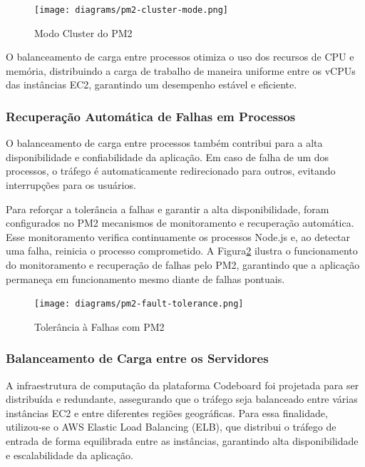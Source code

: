 \begin{figure}[H]
    \centering
    \texttt{[image: diagrams/pm2-cluster-mode.png]}
    \caption{Modo Cluster do PM2}
    \label{fig:pm2-cluster-mode}
\end{figure}

O balanceamento de carga entre processos otimiza o uso dos recursos de CPU e memória, distribuindo a carga de trabalho de maneira uniforme entre os vCPUs das instâncias EC2, garantindo um desempenho estável e eficiente.

\subsubsection{Recuperação Automática de Falhas em Processos}

O balanceamento de carga entre processos também contribui para a alta disponibilidade e confiabilidade da aplicação. Em caso de falha de um dos processos, o tráfego é automaticamente redirecionado para outros, evitando interrupções para os usuários.

Para reforçar a tolerância a falhas e garantir a alta disponibilidade, foram configurados no PM2 mecanismos de monitoramento e recuperação automática. Esse monitoramento verifica continuamente os processos Node.js e, ao detectar uma falha, reinicia o processo comprometido. A Figura\ref{fig:pm2-fault-tolerance} ilustra o funcionamento do monitoramento e recuperação de falhas pelo PM2, garantindo que a aplicação permaneça em funcionamento mesmo diante de falhas pontuais.


\begin{figure}[H]
    \centering
    \texttt{[image: diagrams/pm2-fault-tolerance.png]}
    \caption{Tolerância à Falhas com PM2}
    \label{fig:pm2-fault-tolerance}
\end{figure}


\subsubsection{Balanceamento de Carga entre os Servidores}

A infraestrutura de computação da plataforma Codeboard foi projetada para ser distribuída e redundante, assegurando que o tráfego seja balanceado entre várias instâncias EC2 e entre diferentes regiões geográficas. Para essa finalidade, utilizou-se o AWS Elastic Load Balancing (ELB), que distribui o tráfego de entrada de forma equilibrada entre as instâncias, garantindo alta disponibilidade e escalabilidade da aplicação.

